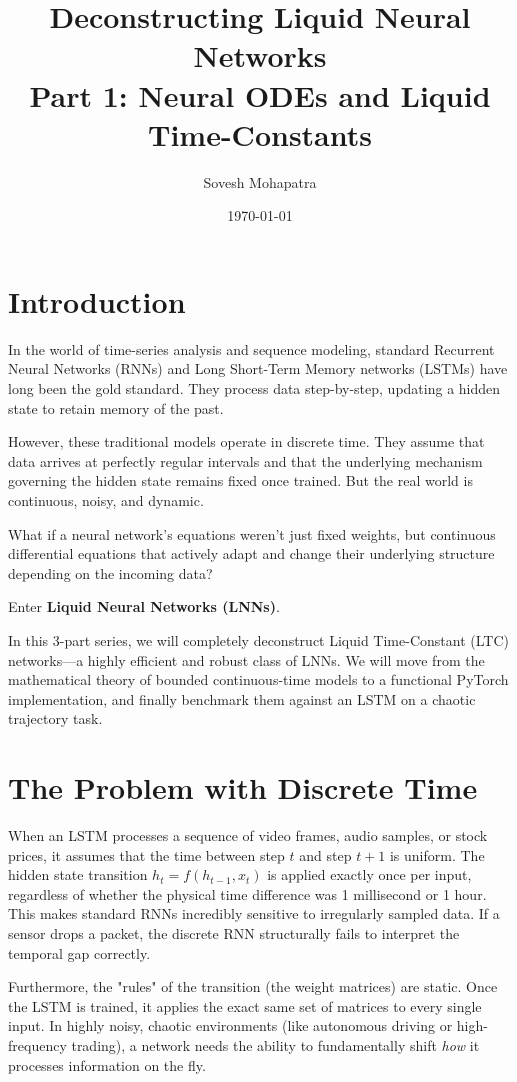 \documentclass[12pt]{article}
\title{\textbf{Deconstructing Liquid Neural Networks \\ Part 1: Neural ODEs and Liquid Time-Constants}}
\author{Sovesh Mohapatra}
\date{\today}
\begin{document}
\maketitle

\section*{Introduction}
In the world of time-series analysis and sequence modeling, standard Recurrent Neural Networks (RNNs) and Long Short-Term Memory networks (LSTMs) have long been the gold standard. They process data step-by-step, updating a hidden state to retain memory of the past. 

However, these traditional models operate in discrete time. They assume that data arrives at perfectly regular intervals and that the underlying mechanism governing the hidden state remains fixed once trained. But the real world is continuous, noisy, and dynamic. 

What if a neural network's equations weren't just fixed weights, but continuous differential equations that actively adapt and change their underlying structure depending on the incoming data?

Enter \textbf{Liquid Neural Networks (LNNs)}.

In this 3-part series, we will completely deconstruct Liquid Time-Constant (LTC) networks—a highly efficient and robust class of LNNs. We will move from the mathematical theory of bounded continuous-time models to a functional PyTorch implementation, and finally benchmark them against an LSTM on a chaotic trajectory task.

\section*{The Problem with Discrete Time}
When an LSTM processes a sequence of video frames, audio samples, or stock prices, it assumes that the time between step $t$ and step $t+1$ is uniform. The hidden state transition $h_t = f(h_{t-1}, x_t)$ is applied exactly once per input, regardless of whether the physical time difference was 1 millisecond or 1 hour. This makes standard RNNs incredibly sensitive to irregularly sampled data. If a sensor drops a packet, the discrete RNN structurally fails to interpret the temporal gap correctly.

Furthermore, the "rules" of the transition (the weight matrices) are static. Once the LSTM is trained, it applies the exact same set of matrices to every single input. In highly noisy, chaotic environments (like autonomous driving or high-frequency trading), a network needs the ability to fundamentally shift \textit{how} it processes information on the fly. 
\end{document}
